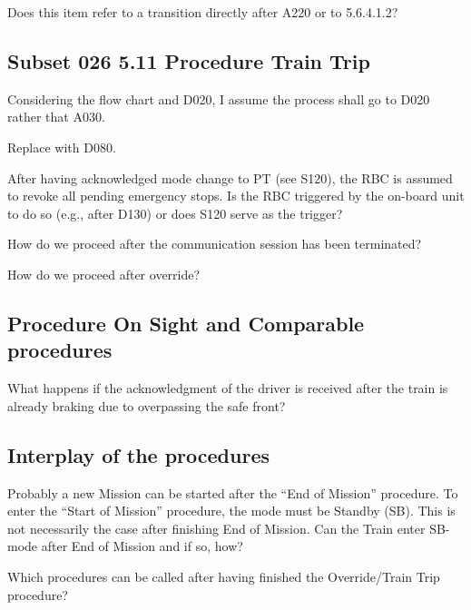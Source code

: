 \documentclass{template/openetcs_article}
\begin{document}
Does this item refer to a transition directly after A220 or to 5.6.4.1.2?





\subsection{Subset 026 5.11 Procedure Train Trip}

Considering the flow chart and D020, I assume the process shall go to D020 rather that A030.

Replace with D080.

After having acknowledged mode change to PT (see S120), the RBC is assumed to revoke all pending emergency stops. Is the RBC triggered by the on-board unit to do so (e.g., after D130) or does S120 serve as the trigger?

How do we proceed after the communication session has been terminated?

How do we proceed after override?

\subsection{Procedure On Sight and Comparable procedures}

What happens if the acknowledgment of the driver is received after the train is already braking due to overpassing the safe front?

\subsection{Interplay of the procedures}

Probably a new Mission can be started after the ``End of Mission'' procedure.
To enter the ``Start of Mission'' procedure, the mode must be Standby (SB).
This is not necessarily the case after finishing End of Mission. 
Can the Train enter SB-mode after End of Mission and if so, how?

Which procedures can be called after having finished the Override/Train Trip procedure?









\end{document}

